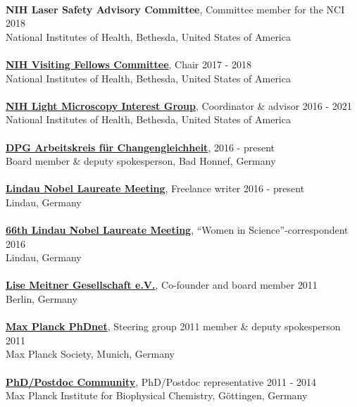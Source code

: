 \documentclass[margin,line]{res}
\begin{document}
\begin{resume}
\vspace*{-3mm}\\
{\bf NIH Laser Safety Advisory Committee}, Committee member for the NCI \hfill {2018}\\
National Institutes of Health, Bethesda, United States of America\\
\vspace*{-3mm}\\
{\bf \href{https://www.training.nih.gov/felcom/visitingfellows2}{NIH Visiting Fellows Committee}}, Chair \hfill {2017 - 2018}\\
National Institutes of Health, Bethesda, United States of America\\
\vspace*{-3mm}\\
{\bf \href{https://confocal.ccr.cancer.gov/light-microscopy-interest-group/}{NIH Light Microscopy Interest Group}}, Coordinator \& advisor  \hfill {2016 - 2021}\\
National Institutes of Health, Bethesda, United States of America\\
\vspace*{-3mm}\\
{\bf  \href{https://www.dpg-physik.de/vereinigungen/fachuebergreifend/ak/akc}{DPG Arbeitskreis für Changengleichheit}}, \hfill {2016 - present}\\
Board member \& deputy spokesperson, Bad Honnef, Germany\\
\vspace*{-3mm}\\
{\bf \href{https://www.lindau-nobel.org/blog-women-in-research-at-lino70/}{Lindau Nobel Laureate Meeting}}, Freelance writer \hfill {2016 - present}\\
Lindau, Germany\\
\vspace*{-3mm}\\
{\bf \href{https://www.br.de/fernsehen/ard-alpha/sendungen/alpha-forum/alpha-forum-extra-spitzenforschung-102.html}{66th Lindau Nobel Laureate Meeting}}, “Women in Science”-correspondent \hfill {2016}\\
Lindau, Germany\\
\vspace*{-3mm}\\
{\bf \href{https://www.lise-meitner-gesellschaft.org/}{Lise Meitner Gesellschaft e.V.}}, Co-founder and board member \hfill {2011}\\
Berlin, Germany\\
\vspace*{-3mm}\\
{\bf \href{https://www.phdnet.mpg.de/home}{Max Planck PhDnet}}, Steering group 2011 member \& deputy spokesperson \hfill {2011}\\
Max Planck Society, Munich, Germany\\
\vspace*{-3mm}\\
{\bf  \href{https://www.mpibpc.mpg.de/phdcom}{PhD/Postdoc Community}}, PhD/Postdoc representative \hfill {2011 - 2014}\\
Max Planck Institute for Biophysical Chemistry, Göttingen, Germany\\


\end{resume}
\end{document}
